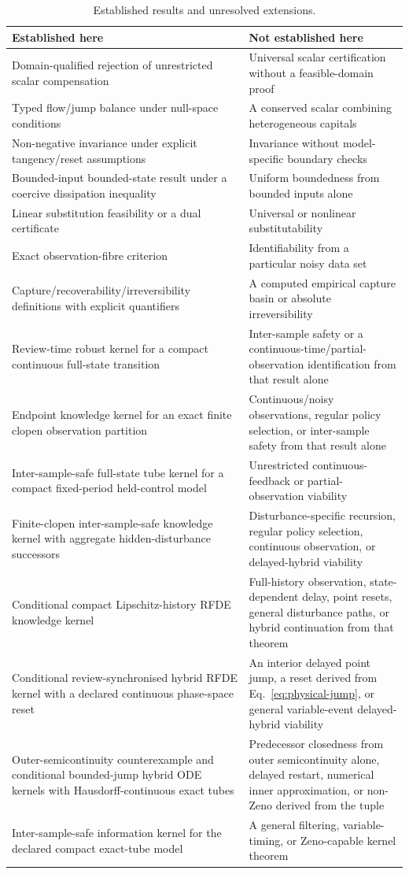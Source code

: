 \documentclass[11pt]{article}
\theoremstyle{definition}
\begin{document}
\begin{table}[h]
\centering
\small
\caption{Established results and unresolved extensions.}
\label{tab:scope}
\begin{tabularx}{\textwidth}{X X}
\toprule
Established here & Not established here\\
\midrule
Domain-qualified rejection of unrestricted scalar compensation & Universal scalar certification without a feasible-domain proof\\
Typed flow/jump balance under null-space conditions & A conserved scalar combining heterogeneous capitals\\
Non-negative invariance under explicit tangency/reset assumptions & Invariance without model-specific boundary checks\\
Bounded-input bounded-state result under a coercive dissipation inequality & Uniform boundedness from bounded inputs alone\\
Linear substitution feasibility or a dual certificate & Universal or nonlinear substitutability\\
Exact observation-fibre criterion & Identifiability from a particular noisy data set\\
Capture/recoverability/irreversibility definitions with explicit quantifiers & A computed empirical capture basin or absolute irreversibility\\
Review-time robust kernel for a compact continuous full-state transition & Inter-sample safety or a continuous-time/partial-observation identification from that result alone\\
Endpoint knowledge kernel for an exact finite clopen observation partition & Continuous/noisy observations, regular policy selection, or inter-sample safety from that result alone\\
Inter-sample-safe full-state tube kernel for a compact fixed-period held-control model & Unrestricted continuous-feedback or partial-observation viability\\
Finite-clopen inter-sample-safe knowledge kernel with aggregate hidden-disturbance successors & Disturbance-specific recursion, regular policy selection, continuous observation, or delayed-hybrid viability\\
Conditional compact Lipschitz-history RFDE knowledge kernel & Full-history observation, state-dependent delay, point resets, general disturbance paths, or hybrid continuation from that theorem\\
Conditional review-synchronised hybrid RFDE kernel with a declared continuous phase-space reset & An interior delayed point jump, a reset derived from Eq.~\eqref{eq:physical-jump}, or general variable-event delayed-hybrid viability\\
Outer-semicontinuity counterexample and conditional bounded-jump hybrid ODE kernels with Hausdorff-continuous exact tubes & Predecessor closedness from outer semicontinuity alone, delayed restart, numerical inner approximation, or non-Zeno derived from the tuple\\
Inter-sample-safe information kernel for the declared compact exact-tube model & A general filtering, variable-timing, or Zeno-capable kernel theorem\\


\end{tabularx}
\end{table}
\end{document}
